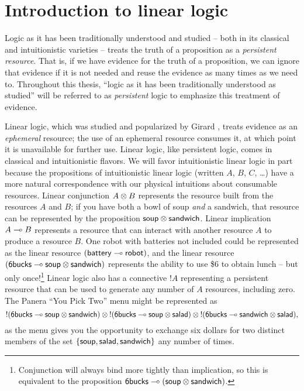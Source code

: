 \section{Introduction to linear logic}
\label{sec:introlinlog}

Logic as it has been traditionally understood and studied -- both in
its classical and intuitionistic varieties -- treats the truth of a
proposition as a {\it persistent resource}. That is, if we have
evidence for the truth of a proposition, we can ignore that evidence
if it is not needed and reuse the evidence as many times as we need
to. Throughout this thesis, ``logic as it has been traditionally
understood as studied'' will be referred to as {\it persistent} logic
to emphasize this treatment of evidence. 

Linear logic, which was studied and
popularized by Girard \cite{girard87linear},
treats evidence as an {\it ephemeral} resource; the use of an
ephemeral resource consumes it, at which point it is unavailable for
further use.  Linear logic, like persistent logic, comes in classical
and intuitionistic flavors. We will favor intuitionistic linear logic
in part because the propositions of intuitionistic linear logic
(written $A$, $B$, $C$, \ldots) have a more natural correspondence
with our physical intuitions about consumable resources. Linear
conjunction $A \otimes B$ represents the resource built from the
resources $A$ and $B$; if you have both a bowl of soup {\it and} a
sandwich, that resource can be represented by the proposition ${\sf
  soup} \otimes {\sf sandwich}$. Linear implication $A \multimap B$
represents a resource that can interact with another resource $A$ to
produce a resource $B$. One robot with batteries not included could be
represented as the linear resource $({\sf battery} \multimap {\sf
  robot})$, and the linear resource $({\sf 6bucks} \multimap {\sf soup}
\otimes {\sf sandwich})$ represents the ability to use \$6 to obtain
lunch -- but only once!\footnote{Conjunction will always bind more
  tightly than implication, so this is equivalent to the proposition
  ${\sf 6bucks} \multimap ({\sf soup} \otimes {\sf sandwich})$.} Linear
logic also has a connective ${!}A$ representing a persistent
resource that can be
used to generate any number of $A$ resources, including zero. The
Panera ``You Pick Two'' menu might be represented as
\[ {!}({\sf 6bucks} \multimap {\sf soup} \otimes {\sf sandwich}) \otimes
{!}({\sf 6bucks} \multimap {\sf soup} \otimes {\sf salad}) \otimes
{!}({\sf 6bucks} \multimap {\sf sandwich} \otimes {\sf salad}),\] as the
menu gives you the opportunity to exchange six dollars for two
distinct members of the set $\{ {\sf soup}, {\sf salad}, {\sf
  sandwich} \}$ any number of times.


